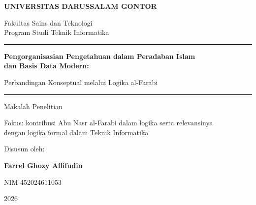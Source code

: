 \documentclass[12pt,a4paper]{article}
\begin{document}
\begin{titlepage}
\centering
{\large\bfseries UNIVERSITAS DARUSSALAM GONTOR\par}
{\normalsize Fakultas Sains dan Teknologi\\Program Studi Teknik Informatika\par}
\vspace{1.4cm}
{\rule{\textwidth}{1pt}\par}
\vspace{0.7cm}
{\Large\bfseries Pengorganisasian Pengetahuan dalam Peradaban Islam\\dan Basis Data Modern:\par}
\vspace{0.25cm}
{\Large Perbandingan Konseptual melalui Logika al-Farabi\par}
\vspace{0.7cm}
{\rule{\textwidth}{1pt}\par}
\vspace{0.9cm}
{\normalsize Makalah Penelitian\par}
\vspace{0.3cm}
{\small Fokus: kontribusi Abu Nasr al-Farabi dalam logika serta relevansinya\\dengan logika formal dalam Teknik Informatika\par}
\vspace{1.4cm}
{\normalsize Disusun oleh:\par}
\vspace{0.2cm}
{\large\bfseries Farrel Ghozy Affifudin\par}
{\normalsize NIM 452024611053\par}
\vfill
{\normalsize 2026\par}
\end{titlepage}

\end{document}
